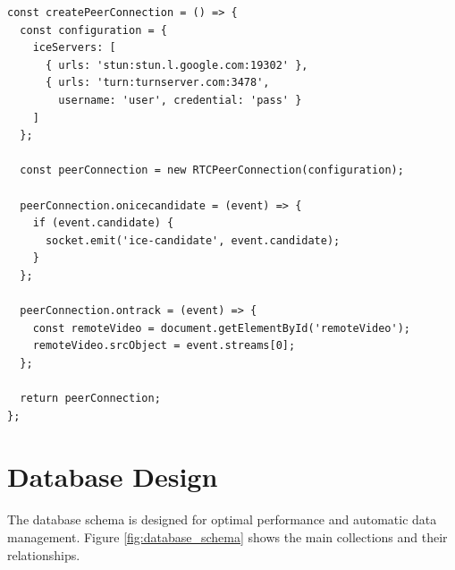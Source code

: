 \documentclass[conference]{IEEEtran}
\begin{document}
\begin{lstlisting}[caption=WebRTC Peer Connection Setup, label=lst:webrtc]
const createPeerConnection = () => {
  const configuration = {
    iceServers: [
      { urls: 'stun:stun.l.google.com:19302' },
      { urls: 'turn:turnserver.com:3478', 
        username: 'user', credential: 'pass' }
    ]
  };
  
  const peerConnection = new RTCPeerConnection(configuration);
  
  peerConnection.onicecandidate = (event) => {
    if (event.candidate) {
      socket.emit('ice-candidate', event.candidate);
    }
  };
  
  peerConnection.ontrack = (event) => {
    const remoteVideo = document.getElementById('remoteVideo');
    remoteVideo.srcObject = event.streams[0];
  };
  
  return peerConnection;
};
\end{lstlisting}

\section{Database Design}

The database schema is designed for optimal performance and automatic data management. Figure \ref{fig:database_schema} shows the main collections and their relationships.
\end{document}
